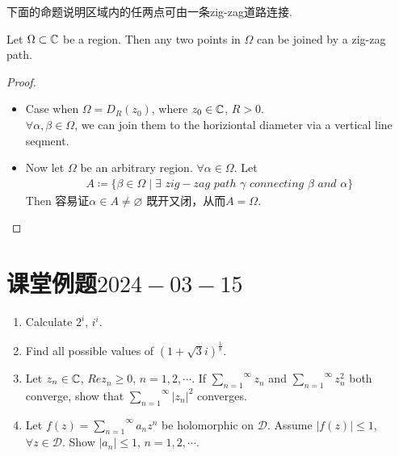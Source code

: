 \vspace{2em}
下面的命题说明区域内的任两点可由一条zig-zag道路连接.
\begin{proposition}\label{prop 3.4.1}
	Let $\Omega \subset \mathbb{C}$ be a region. Then any two points in $\Omega$ can be joined by a zig-zag path.
	
	\vspace{2em}
	\begin{proof}
		\begin{itemize}
			\item Case when $\Omega = D_{R}(z_0)$, where $z_0 \in \mathbb{C}$, $R > 0$.\\
			$\forall \alpha , \beta \in \Omega$, we can join them to the horiziontal diameter via a vertical line seqment.
			
			\item Now let $\Omega$ be an arbitrary region. $\forall \alpha \in \Omega$. Let
			\begin{align}
				A \coloneqq \{ \beta \in \Omega \mid \exists \,\, zig-zag \,\, path \,\, \gamma \,\, connecting \,\, \beta \,\, and \,\, \alpha \}
			\end{align}
			Then 容易证$\alpha \in A \neq \varnothing$ 既开又闭，从而$A = \Omega$.
		\end{itemize}
	\end{proof}
\end{proposition}

\newpage
\section{课堂例题$2024-03-15$}
\begin{enumerate}
	\item Calculate $2^i$, $i^i$.
	
	\vspace{2em}
	
	\item Find all possible values of $(1 + \sqrt{3}i)^{\frac{1}{8}}$.
	
	\vspace{2em}
	
	\item Let $z_n \in \mathbb{C}$, $Rez_n \geq 0$, $n = 1 , 2 , \cdots$. If $\overset{\infty}{\underset{n = 1}{\sum}}{z_n}$ and $\overset{\infty}{\underset{n = 1}{\sum}}{z_{n}^2}$ both converge, show that $\overset{\infty}{\underset{n = 1}{\sum}}{\left| z_n \right|^2}$ converges.
	
	\vspace{2em}
	
	\item Let $f(z) = \overset{\infty}{\underset{n = 1}{\sum}}{a_n z^n}$ be holomorphic on $\mathcal{D}$. Assume $\left| f(z) \right| \leq 1$, $\forall z \in \mathcal{D}$. Show $\left| a_n \right| \leq 1$, $n = 1 , 2 , \cdots$.
	
	\vspace{2em}
\end{enumerate}






	\ifx\allfiles\undefined

\fi